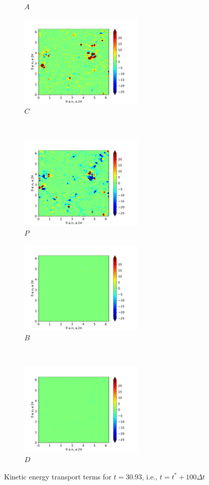 \begin{figure}[H]
\begin{subfigure}{0.45\textwidth}
        \caption{$A$}
    \end{subfigure}
    \newline
    \begin{subfigure}{0.45\textwidth}
        \includegraphics[height=1.75in]{media/run-cds-65/C-ke-1440}
        \caption{$C$}
    \end{subfigure}
    ~
    \begin{subfigure}{0.45\textwidth}
        \includegraphics[height=1.75in]{media/run-cds-65/P-ke-1440}
        \caption{$P$}
    \end{subfigure}
    \newline
    \begin{subfigure}{0.45\textwidth}
        \includegraphics[height=1.75in]{media/run-cds-65/B-ke-1440}
        \caption{$B$}
    \end{subfigure}
    ~
    \begin{subfigure}{0.45\textwidth}
        \includegraphics[height=1.75in]{media/run-cds-65/D-ke-1440}
        \caption{$D$}
    \end{subfigure}
    \caption{Kinetic energy transport terms for $t=30.93$, i.e., $t=t^{\ast} + 100 \Delta t$}
\end{figure}

